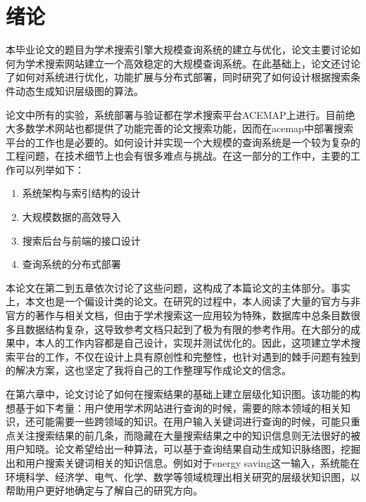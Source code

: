 
\chapter{绪论}
\label{chap:c1}

本毕业论文的题目为学术搜索引擎大规模查询系统的建立与优化，论文主要讨论如何为学术搜索网站建立一个高效稳定的大规模查询系统。在此基础上，论文还讨论了如何对系统进行优化，功能扩展与分布式部署，同时研究了如何设计根据搜索条件动态生成知识层级图的算法。

论文中所有的实验，系统部署与验证都在学术搜索平台ACEMAP上进行。目前绝大多数学术网站也都提供了功能完善的论文搜索功能，因而在acemap中部署搜索平台的工作也是必要的。如何设计并实现一个大规模的查询系统是一个较为复杂的工程问题，在技术细节上也会有很多难点与挑战。在这一部分的工作中，主要的工作可以列举如下：

\begin{enumerate}
  \item 系统架构与索引结构的设计
  \item 大规模数据的高效导入
  \item 搜索后台与前端的接口设计
  \item 查询系统的分布式部署
\end{enumerate}

本论文在第二到五章依次讨论了这些问题，这构成了本篇论文的主体部分。事实上，本文也是一个偏设计类的论文。在研究的过程中，本人阅读了大量的官方与非官方的著作与相关文档，但由于学术搜索这一应用较为特殊，数据库中总条目数很多且数据结构复杂，这导致参考文档只起到了极为有限的参考作用。在大部分的成果中，本人的工作内容都是自己设计，实现并测试优化的。因此，这项建立学术搜索平台的工作，不仅在设计上具有原创性和完整性，也针对遇到的棘手问题有独到的解决方案，这也坚定了我将自己的工作整理写作成论文的信念。

在第六章中，论文讨论了如何在搜索结果的基础上建立层级化知识图。该功能的构想基于如下考量：用户使用学术网站进行查询的时候，需要的除本领域的相关知识，还可能需要一些跨领域的知识。在用户输入关键词进行查询的时候，可能只重点关注搜索结果的前几条，而隐藏在大量搜索结果之中的知识信息则无法很好的被用户知晓。论文希望给出一种算法，可以基于查询结果自动生成知识脉络图，挖掘出和用户搜索关键词相关的知识信息。例如对于energy saving这一输入，系统能在环境科学、经济学、电气、化学、数学等领域梳理出相关研究的层级状知识图，以帮助用户更好地确定与了解自己的研究方向。


